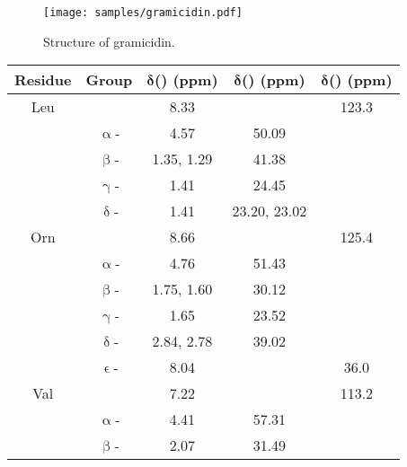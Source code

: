 \begin{figure}[!ht]
    \centering
    \texttt{[image: samples/gramicidin.pdf]}%
    \caption[Structure of gramicidin]{
        Structure of gramicidin.
    }
    \label{fig:samples_gramicidin}
\end{figure}

\begin{table}[!ht]
    \begin{tabular}{ccSSS}
        \toprule
        \textbf{Residue} & \textbf{Group} & {$\symbf{\delta}$\textbf{(\proton{}) (ppm)}} & {$\symbf{\delta}$\textbf{(\carbon{}) (ppm)}} & {$\symbf{\delta}$\textbf{(\nitrogen{}) (ppm)}} \\
        \midrule
        Leu            &                   & 8.33         &                & 123.3 \\
                       & $\upalpha$-       & 4.57         & 50.09          &       \\
                       & $\upbeta$-       & {1.35, 1.29} & 41.38          &       \\
                       & $\upgamma$-       & 1.41         & 24.45          &       \\
                       & $\updelta$-      & 1.41         & {23.20, 23.02} &       \\
        \midrule
        Orn            &                   & 8.66         &                & 125.4 \\
                       & $\upalpha$-       & 4.76         & 51.43          &       \\
                       & $\upbeta$-       & {1.75, 1.60} & 30.12          &       \\
                       & $\upgamma$-      & 1.65         & 23.52          &       \\
                       & $\updelta$-      & {2.84, 2.78} & 39.02          &       \\
                       & $\upvarepsilon$- & 8.04         &                & 36.0  \\
        \midrule
        Val            &                   & 7.22         &                & 113.2 \\
                       & $\upalpha$-       & 4.41         & 57.31          &       \\
                       & $\upbeta$-        & 2.07         & 31.49          &       \\

\end{tabular}
\end{table}
